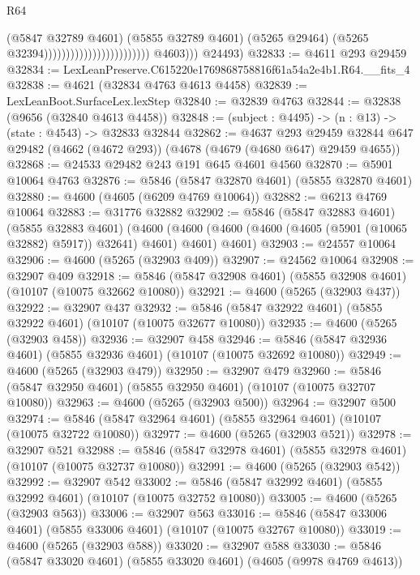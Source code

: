 \begin{lexlean}{R64}
\begin{coremodule}
                                                          (@5847 @32789 @4601)
                                                          (@5855 @32789 @4601)
                                                          (@5265 @29464)
                                                          (@5265 @32394))))))))))))))))))))))))
            @4603)))
      @24493)
@32833 := @4611 @293 @29459
@32834 := LexLeanPreserve.C615220e1769868758816f61a54a2e4b1.R64.__fits_4
@32838 := @4621 (@32834 @4763 @4613 @4458)
@32839 := LexLeanBoot.SurfaceLex.lexStep
@32840 := @32839 @4763
@32844 := @32838 (@9656 (@32840 @4613 @4458))
@32848 := (subject : @4495) -> (n : @13) -> (state : @4543) -> @32833 @32844
@32862 := @4637
    @293
    @29459
    @32844
    @647
    @29482
    (@4662 (@4672 @293))
    (@4678 (@4679 (@4680 @647) @29459 @4655))
@32868 := @24533 @29482 @243 @191 @645 @4601 @4560
@32870 := @5901 @10064 @4763
@32876 := @5846 (@5847 @32870 @4601) (@5855 @32870 @4601)
@32880 := @4600 (@4605 (@6209 @4769 @10064))
@32882 := @6213 @4769 @10064
@32883 := @31776 @32882
@32902 := @5846
    (@5847 @32883 @4601)
    (@5855 @32883 @4601)
    (@4600 (@4600 (@4600 (@4600 (@4605 (@5901 (@10065 @32882) @5917)) @32641) @4601) @4601) @4601)
@32903 := @24557 @10064
@32906 := @4600 (@5265 (@32903 @409))
@32907 := @24562 @10064
@32908 := @32907 @409
@32918 := @5846 (@5847 @32908 @4601) (@5855 @32908 @4601) (@10107 (@10075 @32662 @10080))
@32921 := @4600 (@5265 (@32903 @437))
@32922 := @32907 @437
@32932 := @5846 (@5847 @32922 @4601) (@5855 @32922 @4601) (@10107 (@10075 @32677 @10080))
@32935 := @4600 (@5265 (@32903 @458))
@32936 := @32907 @458
@32946 := @5846 (@5847 @32936 @4601) (@5855 @32936 @4601) (@10107 (@10075 @32692 @10080))
@32949 := @4600 (@5265 (@32903 @479))
@32950 := @32907 @479
@32960 := @5846 (@5847 @32950 @4601) (@5855 @32950 @4601) (@10107 (@10075 @32707 @10080))
@32963 := @4600 (@5265 (@32903 @500))
@32964 := @32907 @500
@32974 := @5846 (@5847 @32964 @4601) (@5855 @32964 @4601) (@10107 (@10075 @32722 @10080))
@32977 := @4600 (@5265 (@32903 @521))
@32978 := @32907 @521
@32988 := @5846 (@5847 @32978 @4601) (@5855 @32978 @4601) (@10107 (@10075 @32737 @10080))
@32991 := @4600 (@5265 (@32903 @542))
@32992 := @32907 @542
@33002 := @5846 (@5847 @32992 @4601) (@5855 @32992 @4601) (@10107 (@10075 @32752 @10080))
@33005 := @4600 (@5265 (@32903 @563))
@33006 := @32907 @563
@33016 := @5846 (@5847 @33006 @4601) (@5855 @33006 @4601) (@10107 (@10075 @32767 @10080))
@33019 := @4600 (@5265 (@32903 @588))
@33020 := @32907 @588
@33030 := @5846 (@5847 @33020 @4601) (@5855 @33020 @4601) (@4605 (@9978 @4769 @4613))

\end{coremodule}
\end{lexlean}
